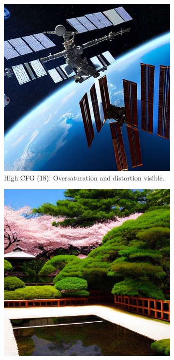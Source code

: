 \documentclass[10pt,twocolumn]{article}
\begin{document}
\begin{figure}[H]
    \centering
    \begin{subfigure}{0.45\textwidth}
        \centering
        \includegraphics[width=\linewidth]{figures/bad_high_cfg_artifact.png}
        \caption{High CFG (18): Oversaturation and distortion visible.}
    \end{subfigure}\hfill
    \begin{subfigure}{0.45\textwidth}
        \centering
        \includegraphics[width=\linewidth]{figures/stabilized_output.png}

\end{subfigure}
\end{figure}
\end{document}
